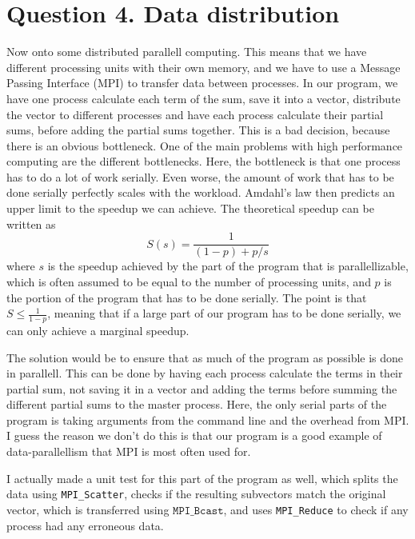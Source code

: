 \documentclass[12pt]{article}
\begin{document}
\section{Question 4. Data distribution}
Now onto some distributed parallell computing. This means that we have different processing units with their own memory, and we have to use a Message Passing Interface (MPI) to transfer
data between processes.
In our program, we have one process calculate each term of the sum, save it into a vector, distribute the vector to different processes and have each process calculate
their partial sums, before adding the partial sums together. This is a bad decision, because there is an obvious bottleneck. One of the main problems with high performance computing
are the different bottlenecks. Here, the bottleneck is that one process has to do a lot of work serially. Even worse, the amount of work that has to be done serially perfectly scales
with the workload. Amdahl's law then predicts an upper limit to the speedup we can achieve. The theoretical speedup can be written as
\begin{equation}
    S(s) = \frac{1}{(1-p) + p/s}
\end{equation}
where $s$ is the speedup achieved by the part of the program that is parallellizable, which is often assumed to be equal to the number of processing units, and $p$ is the portion of the 
program that has to be done serially. The point is that $S \le \frac{1}{1-p}$, meaning that if a large part of our program has to be done serially, we can only achieve a marginal speedup.

The solution would be to ensure that as much of the program as possible is done in parallell. This can be done by having each process calculate the terms in their partial sum, not saving it
in a vector and adding the terms before summing the different partial sums to the master process. Here, the only serial parts of the program is taking arguments from the command line
and the overhead from MPI. I guess the reason we don't do this is that our program is a good example of data-parallellism that MPI is most often used for.

I actually made a unit test for this part of the program as well, which splits the data using \texttt{MPI\_Scatter}, checks if the resulting subvectors match the original vector, 
which is transferred using $\texttt{MPI\_Bcast}$, and uses
\texttt{MPI\_Reduce} to check if any process had any erroneous data.
\end{document}
